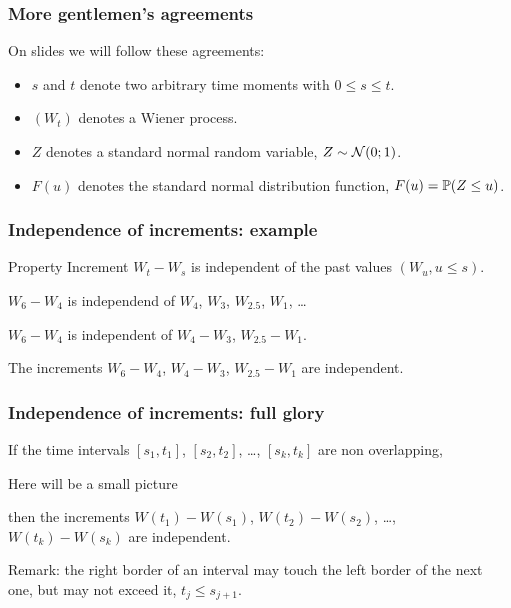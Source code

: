 \begin{frame}
  \frametitle{More gentlemen's agreements}

  On slides we will follow these agreements:
  \begin{itemize}[<+->]
    \item $s$ and $t$ denote two arbitrary time moments with $0 \leq s \leq t$.
    \item $(W_t)$ denotes a Wiener process.
    \item $Z$ denotes a standard normal random variable, $Z \sim \cN(0;1)$.
    \item $F(u)$ denotes the standard normal distribution function, $F(u) = \P(Z \leq u)$.
  \end{itemize}
  

\end{frame}



\begin{frame}
  \frametitle{Independence of increments: example}
  \begin{block}{Property}
    Increment $W_t - W_s$ is independent of the past values $(W_u, u\leq s)$.  
  \end{block}

  \pause 
  $W_6 - W_4$ is independend of $W_4$, $W_{3}$, $W_{2.5}$, $W_1$, \ldots 

  \pause 
  $W_6 - W_4$ is independent of $W_4 - W_3$, $W_{2.5} - W_{1}$.

  \pause
  The increments $W_6 - W_4$, $W_4 - W_3$, $W_{2.5} - W_1$ are independent. 

\end{frame}


\begin{frame}
  \frametitle{Independence of increments: full glory}


  If the time intervals $[s_1, t_1]$, $[s_2, t_2]$, \ldots, $[s_k, t_k]$ are
  \alert{non overlapping},

  Here will be a small picture 

  \pause 
  then the increments $W(t_1) - W(s_1)$, $W(t_2) - W(s_2)$, \ldots, $W(t_k) - W(s_k)$ are independent. 

  \pause
  Remark: the right border of an interval \alert{may touch} the left border of the next one,
  but \alert{may not exceed} it, $t_j \leq s_{j+1}$. 

\end{frame}


